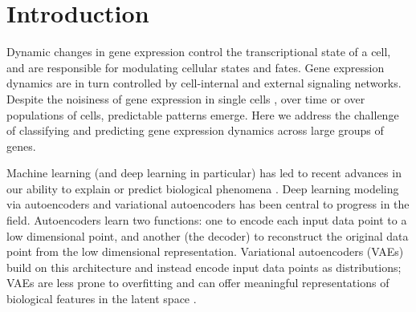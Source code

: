 


\section{Introduction}
Dynamic changes in gene expression control the transcriptional state of a cell, and are responsible for modulating cellular states and fates. Gene expression dynamics are in turn controlled by cell-internal and external signaling networks. Despite the noisiness of gene expression in single cells \citep{raj2008nature}, over time or over populations of cells, predictable patterns emerge. Here we address the challenge of classifying and predicting gene expression dynamics across large groups of genes.
\par 
Machine learning (and deep learning in particular) has led to recent advances in our ability to explain or predict biological phenomena \citep{ching2018opportunities}. Deep learning modeling via autoencoders \citep{hinton2006reducing} and variational autoencoders \citep{Kingma2014} has been central to progress in the field. Autoencoders learn two functions: one to encode each input data point to a low dimensional point, and another (the decoder) to reconstruct the original data point from the low dimensional representation. Variational autoencoders (VAEs) build on this architecture and instead encode input data points as distributions; VAEs are less prone to overfitting and can offer meaningful representations of biological features in the latent space \citep{way2017extracting}.


